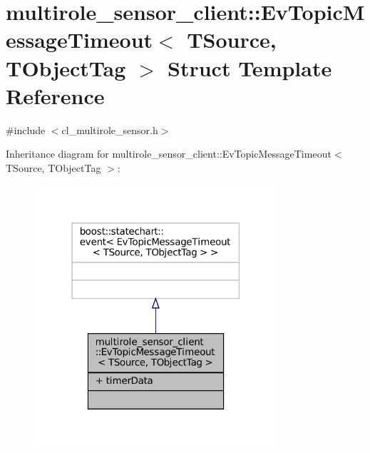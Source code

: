 \hypertarget{structmultirole__sensor__client_1_1EvTopicMessageTimeout}{}\section{multirole\+\_\+sensor\+\_\+client\+:\+:Ev\+Topic\+Message\+Timeout$<$ T\+Source, T\+Object\+Tag $>$ Struct Template Reference}
\label{structmultirole__sensor__client_1_1EvTopicMessageTimeout}


{\ttfamily \#include $<$cl\+\_\+multirole\+\_\+sensor.\+h$>$}



Inheritance diagram for multirole\+\_\+sensor\+\_\+client\+:\+:Ev\+Topic\+Message\+Timeout$<$ T\+Source, T\+Object\+Tag $>$\+:
\nopagebreak
\begin{figure}[H]
\begin{center}
\leavevmode
\includegraphics[width=256pt]{structmultirole__sensor__client_1_1EvTopicMessageTimeout__inherit__graph}
\end{center}
\end{figure}


